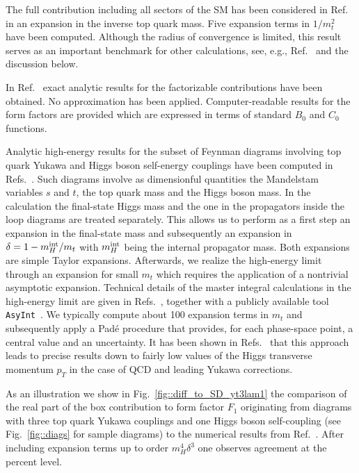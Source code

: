 The full contribution including all sectors of the SM has been considered in
Ref.~\cite{Davies:2023npk} in an expansion in the inverse top quark mass. Five
expansion terms in $1/m_t^2$ have been computed. Although the radius of convergence is
limited, this result serves as an important benchmark for other calculations,
see, e.g., Ref.~\cite{Bi:2023bnq} and the discussion below.

In Ref.~\cite{Zhang:2024rix} exact analytic results for the factorizable
contributions have been obtained. No approximation has been
applied. Computer-readable results for the form factors are provided which are
expressed in terms of standard $B_0$ and $C_0$ functions.

Analytic high-energy results for the subset of Feynman diagrams involving top quark
Yukawa and Higgs boson self-energy couplings have been computed in
Refs.~\cite{Davies:2022ram,Davies:2025wke}.  Such diagrams involve as
dimensionful quantities the Mandelstam variables $s$ and $t$, the top quark
mass and the Higgs boson mass.  In the calculation the final-state Higgs mass
and the one in the propagators inside the loop diagrams are treated separately. This
allows us to perform as a first step an expansion in the final-state mass and
subsequently an expansion in $\delta = 1-m_H^{\rm int}/m_t$ with $m_H^{\rm int}$ being the
internal propagator mass. Both expansions are simple Taylor expansions.
Afterwards, we realize the high-energy limit through an expansion for small
$m_t$ which requires the application of a nontrivial asymptotic expansion.
%
Technical details of the master integral calculations in the high-energy limit are given in Refs.~\cite{Zhang:2024fcu,Davies:2022ram,Davies:2025wke},
together with a publicly available tool \texttt{AsyInt}~\cite{Zhang:2024fcu}.
%
We typically compute about 100 expansion terms in $m_t$ and subsequently apply
a Pad\'e procedure that provides, for each phase-space point, a central value
and an uncertainty. It has been shown in Refs.~\cite{Davies:2022ram, Davies:2023vmj} that this
approach leads to precise results down to
fairly low values of the Higgs transverse momentum $p_T$ in the case of QCD and leading Yukawa corrections.

As an illustration we show in Fig.~\ref{fig::diff_to_SD_yt3lam1} the
comparison of the real part of the box contribution to form factor $F_1$
originating from diagrams with three top quark Yukawa couplings and one Higgs
boson self-coupling (see Fig.~\ref{fig::diags} for sample diagrams) to the
numerical results from Ref.~\cite{Heinrich:2024dnz}. After including expansion
terms up to order $m_H^4\delta^3$ one observes agreement at the percent level.

